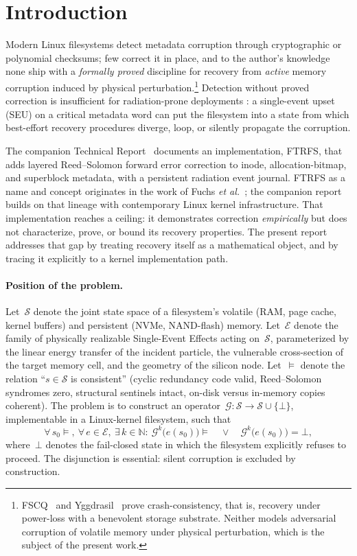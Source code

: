 \section{Introduction}\label{sec:intro}

Modern Linux filesystems detect metadata corruption through cryptographic
or polynomial checksums; few correct it in place, and to the
author's knowledge none ship with a \emph{formally proved} discipline
for recovery from \emph{active} memory corruption induced by physical
perturbation.\footnote{FSCQ~\cite{chen2015fscq} and
Yggdrasil~\cite{sigurbjarnarson2016yggdrasil} prove crash-consistency,
that is, recovery under power-loss with a benevolent storage substrate.
Neither models adversarial corruption of volatile memory under physical
perturbation, which is the subject of the present work.}
Detection without proved correction is insufficient for radiation-prone
deployments \cite{nasa-seeca,esa-eccs60,normand1996}: a single-event
upset (SEU) on a critical metadata word can put the filesystem into a
state from which best-effort recovery procedures diverge, loop, or
silently propagate the corruption.

The companion Technical Report~\cite{desbrieres2026ftrfs} documents an
implementation, FTRFS, that adds layered Reed--Solomon forward error
correction to inode, allocation-bitmap, and superblock metadata, with a
persistent radiation event journal. FTRFS as a name and concept
originates in the work of Fuchs \emph{et al.}~\cite{fuchs2015ftrfs};
the companion report builds on that lineage with contemporary Linux
kernel infrastructure. That implementation reaches a
ceiling: it demonstrates correction \emph{empirically} but does not
characterize, prove, or bound its recovery properties. The present
report addresses that gap by treating recovery itself as a mathematical
object, and by tracing it explicitly to a kernel implementation path.

\paragraph{Position of the problem.}
Let~\(\mathcal{S}\) denote the joint state space of a filesystem's
volatile (RAM, page cache, kernel buffers) and persistent (NVMe,
NAND-flash) memory. Let~\(\mathcal{E}\) denote the family of physically
realizable Single-Event Effects acting on~\(\mathcal{S}\), parameterized
by the linear energy transfer of the incident particle, the vulnerable
cross-section of the target memory cell, and the geometry of the
silicon node. Let~\(\models\) denote the relation ``\(s \in
\mathcal{S}\) is consistent'' (cyclic redundancy code valid, Reed--Solomon
syndromes zero, structural sentinels intact, on-disk versus in-memory
copies coherent). The problem is to construct an
operator~\(\mathcal{G} : \mathcal{S} \to \mathcal{S} \cup \{\bot\}\),
implementable in a Linux-kernel filesystem, such that
\[
  \forall\, s_0 \models,\ \forall\, e \in \mathcal{E},\
  \exists\, k \in \mathbb{N} :\
  \mathcal{G}^{k}\bigl(e(s_0)\bigr) \models
  \quad\lor\quad
  \mathcal{G}^{k}\bigl(e(s_0)\bigr) = \bot,
\]
where~\(\bot\) denotes the fail-closed state in which the filesystem
explicitly refuses to proceed. The disjunction is essential: silent
corruption is excluded by construction.

